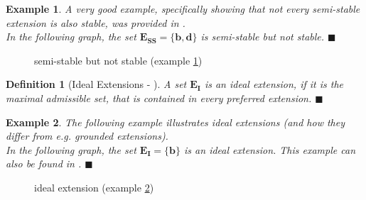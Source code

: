 \documentclass[12pt]{report}
\numberwithin{figure}{chapter}
\theoremstyle{break}
\newtheorem{defn}{Definition}[chapter]
\newtheorem{exmpl}{Example}[chapter]
\newenvironment{mydefn}{\begin{defn}}{$\blacksquare$ \end{defn}}
\newenvironment{myexmpl}{\begin{exmpl}}{$\blacksquare$ \end{exmpl}}
\begin{document}
\begin{myexmpl}
A very good example, specifically showing that not every semi-stable extension is also stable, was provided in \cite{Caminada}.\\
In the following graph, the set $\bm{E_{SS}=\{b,d\}}$ is semi-stable but not stable.
\label{stable != semi-stable}
\end{myexmpl}
\begin{figure}[h!]
\begin{center}\end{center}
\caption{semi-stable but not stable (example \ref{stable != semi-stable})}
\end{figure}

\newpage

\begin{mydefn}[Ideal Extensions - \cite{Dung2}]
A set $\bm{E_{I}}$ is an ideal extension, if it is the maximal admissible set, that is contained in every preferred extension.
\label{ideal ext}
\end{mydefn}

\begin{myexmpl}
The following example illustrates ideal extensions (and how they differ from e.g. grounded extensions).\\
In the following graph, the set $\bm{E_{I}=\{b\}}$ is an ideal extension. This example can also be found in \cite{Dung2}.
\label{ideal extension}
\end{myexmpl}
\begin{figure}[h!]
\begin{center}\end{center}
\caption{ideal extension (example \ref{ideal extension})}
\end{figure}
\end{document}
